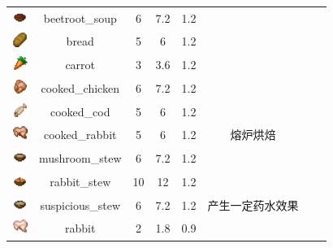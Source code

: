 \begin{center}
\begin{longtable}{c|c|ccc|ccc}
        \includegraphics[width=0.5cm,height=0.5cm]{./images/origin/beetroot_soup.png} & beetroot\_soup & 6 & 7.2 & 1.2 & \\ 
        \includegraphics[width=0.5cm,height=0.5cm]{./images/origin/bread.png} & bread & 5 & 6 & 1.2 & \\ 
        \includegraphics[width=0.5cm,height=0.5cm]{./images/origin/carrot.png} & carrot & 3 & 3.6 & 1.2 & \\ 
        \includegraphics[width=0.5cm,height=0.5cm]{./images/origin/cooked_chicken.png} & cooked\_chicken & 6 & 7.2 & 1.2 & \\ 
        \includegraphics[width=0.5cm,height=0.5cm]{./images/origin/cooked_cod.png} & cooked\_cod & 5 & 6 & 1.2 & \\ 
        \includegraphics[width=0.5cm,height=0.5cm]{./images/origin/cooked_rabbit.png} & cooked\_rabbit & 5 & 6 & 1.2 & 熔炉烘焙 \\ 
        \includegraphics[width=0.5cm,height=0.5cm]{./images/origin/mushroom_stew.png} & mushroom\_stew & 6 & 7.2 & 1.2 & \\ 
        \includegraphics[width=0.5cm,height=0.5cm]{./images/origin/rabbit_stew.png} & rabbit\_stew & 10 & 12 & 1.2 & \\ 
        \includegraphics[width=0.5cm,height=0.5cm]{./images/origin/suspicious_stew.png} & suspicious\_stew & 6 & 7.2 & 1.2 & 产生一定药水效果 \\
        \midrule
        \includegraphics[width=0.5cm,height=0.5cm]{./images/origin/rabbit.png} & rabbit & 2 & 1.8 & 0.9 &  \\ 

\end{longtable}
\end{center}
